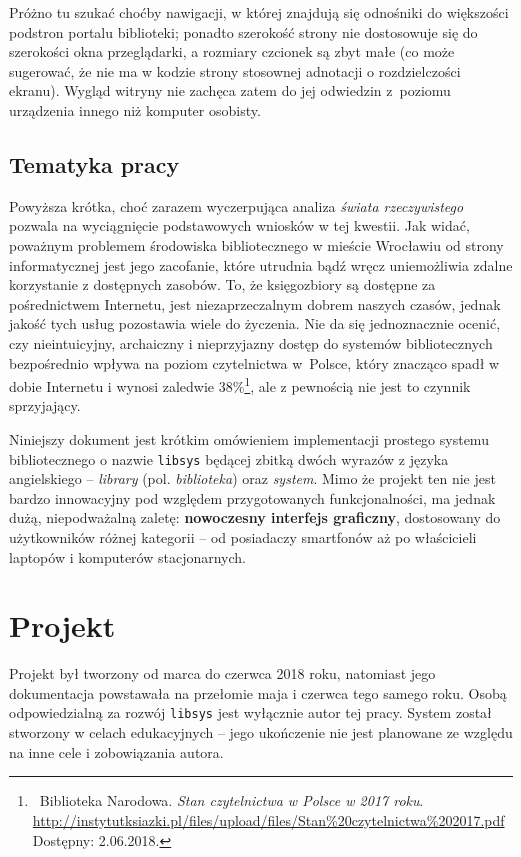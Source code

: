 \documentclass[12pt, a4paper]{article}
\begin{document}
Próżno tu szukać choćby nawigacji, w której znajdują się odnośniki do większości podstron portalu biblioteki; ponadto szerokość strony nie dostosowuje się do szerokości okna przeglądarki, a rozmiary czcionek są zbyt małe (co może sugerować, że nie ma w kodzie strony stosownej adnotacji o rozdzielczości ekranu). Wygląd witryny nie zachęca zatem do jej odwiedzin z~poziomu urządzenia innego niż komputer osobisty.

\subsection{Tematyka pracy}
Powyższa krótka, choć zarazem wyczerpująca analiza \textit{świata rzeczywistego} pozwala na wyciągnięcie podstawowych wniosków w tej kwestii. Jak widać, poważnym problemem środowiska bibliotecznego w mieście Wrocławiu od strony informatycznej jest jego zacofanie, które utrudnia bądź wręcz uniemożliwia zdalne korzystanie z dostępnych zasobów. To, że księgozbiory są dostępne za pośrednictwem Internetu, jest niezaprzeczalnym dobrem naszych czasów, jednak jakość tych usług pozostawia wiele do życzenia. Nie da się jednoznacznie ocenić, czy nieintuicyjny, archaiczny i nieprzyjazny dostęp do systemów bibliotecznych bezpośrednio wpływa na poziom czytelnictwa w~Polsce, który znacząco spadł w dobie Internetu i wynosi zaledwie 38\%\footnote{\ Biblioteka Narodowa. \textit{Stan czytelnictwa w Polsce w 2017 roku}. \url{http://instytutksiazki.pl/files/upload/files/Stan\%20czytelnictwa\%202017.pdf} Dostępny: 2.06.2018.}, ale z pewnością nie jest to czynnik sprzyjający.

Niniejszy dokument jest krótkim omówieniem implementacji prostego systemu bibliotecznego o nazwie \texttt{libsys} będącej zbitką dwóch wyrazów z języka angielskiego -- \textit{library} (pol. \textit{biblioteka}) oraz \textit{system}. Mimo że projekt ten nie jest bardzo innowacyjny pod względem przygotowanych funkcjonalności, ma jednak dużą, niepodważalną zaletę: \textbf{nowoczesny interfejs graficzny}, dostosowany do użytkowników różnej kategorii -- od posiadaczy smartfonów aż po właścicieli laptopów i komputerów stacjonarnych.

\section{Projekt}

Projekt był tworzony od marca do czerwca 2018 roku, natomiast jego dokumentacja powstawała na przełomie maja i czerwca tego samego roku. Osobą odpowiedzialną za rozwój \texttt{libsys} jest wyłącznie autor tej pracy. System został stworzony w celach edukacyjnych -- jego ukończenie nie jest planowane ze względu na inne cele i zobowiązania autora.
\end{document}
